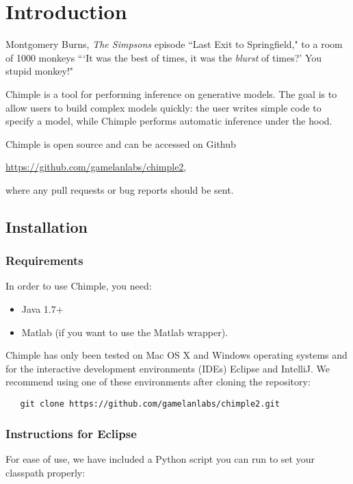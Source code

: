\chapter{Introduction}

\begin{chapquote}{\scriptsize Montgomery Burns, \textit{The Simpsons} episode ``Last Exit to
    Springfield," to a room of 1000 monkeys}
```It was the best of times, it was the \emph{blurst} of times?' You stupid monkey!"
\end{chapquote}
%
\noindent
Chimple is a tool for performing inference on generative models.
The goal is to allow users to build complex models quickly: the user writes
simple code to specify a model, while Chimple performs automatic inference
under the hood.

Chimple is open source and can be accessed on Github
\begin{center}
\href{https://github.com/gamelanlabs/chimple2}{https://github.com/gamelanlabs/chimple2},
\end{center}
where any pull requests or bug reports should be sent.

\section{Installation}

\subsection{Requirements}
In order to use Chimple, you need:
\begin{itemize}
   \item Java 1.7+
   \item Matlab (if you want to use the Matlab wrapper).
\end{itemize}

Chimple has only been tested on Mac OS X and Windows operating systems
and for the interactive development environments (IDEs) Eclipse and IntelliJ.
We recommend using one of these environments after cloning the repository:
\begin{verbatim}
   git clone https://github.com/gamelanlabs/chimple2.git
\end{verbatim}

\subsection{Instructions for Eclipse}
For ease of use, we have included a Python script you can run to set your
classpath properly:

